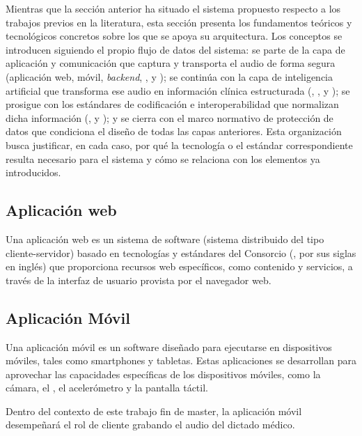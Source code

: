 Mientras que la sección anterior ha situado el sistema propuesto respecto a los trabajos previos
en la literatura, esta sección presenta los fundamentos teóricos y tecnológicos concretos sobre
los que se apoya su arquitectura. Los conceptos se introducen siguiendo
el propio flujo de datos del sistema: se parte de la capa de aplicación y comunicación que
captura y transporta el audio de forma segura (aplicación web, móvil, \textit{backend},
,  y ); se continúa con la capa de
inteligencia artificial que transforma ese audio en información clínica estructurada
(, ,  y ); se prosigue con los
estándares de codificación e interoperabilidad que normalizan dicha información
(,  y ); y se cierra con el marco
normativo de protección de datos que condiciona el diseño de todas las capas anteriores. Esta
organización busca justificar, en cada caso, por qué la tecnología o el estándar correspondiente
resulta necesario para el sistema y cómo se relaciona con los elementos ya introducidos.

\subsection{Aplicación web}

Una aplicación web es un sistema de software (sistema distribuido del tipo cliente-servidor) basado
en tecnologías y estándares del Consorcio  (, por sus siglas en inglés)
que proporciona recursos web específicos, como contenido y servicios, a través de la interfaz
de usuario provista por el navegador web.

\subsection{Aplicación Móvil}

Una aplicación móvil es un software diseñado para ejecutarse en dispositivos móviles,
tales como smartphones y tabletas. Estas aplicaciones se desarrollan para aprovechar las capacidades específicas de los dispositivos móviles,
como la cámara, el , el acelerómetro y la pantalla táctil.

Dentro del contexto de este trabajo fin de master, la aplicación móvil desempeñará el rol de cliente grabando
el audio del dictado médico.

